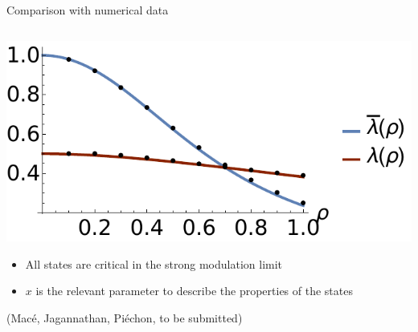 \documentclass[xcolor=x11names,compress,professionalfonts]{beamer}
\renewcommand{\(}{\begin{columns}}
\renewcommand{\)}{\end{columns}}
\newcommand{\<}[1]{\begin{column}{#1}}
\renewcommand{\>}{\end{column}}
\begin{document}
\begin{frame}{Comparison with numerical data}
\begin{columns}
\begin{column}{6cm}
		\includegraphics[scale=.4]{renorm_th_num.pdf}
		
		\begin{itemize}
			\item All states are critical in the strong modulation limit
			\item $x$ is the relevant parameter to describe the properties of the states
		\end{itemize}
		
		\begin{flushright}
		\scriptsize{(Macé, Jagannathan, Piéchon, to be submitted)}
		\end{flushright}
	\end{column}
\end{columns}
\end{frame}
\end{document}
